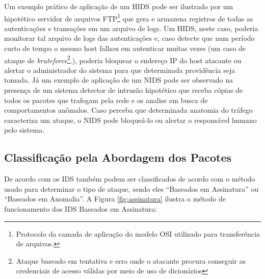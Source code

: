 Um exemplo prático de aplicação de um HIDS pode ser ilustrado por um hipotético servidor de arquivos FTP\footnote{Protocolo da camada de aplicação do modelo OSI utilizado para transferência de arquivos.} que gera e armazena registros de todas as autenticações e transações em um arquivo de logs. Um HIDS, neste caso, poderia monitorar tal arquivo de logs das autenticações e, caso detecte que num período curto de tempo o mesmo host falhou em autenticar muitas vezes (um caso de ataque de \textit{bruteforce}\footnote{Ataque baseado em tentativa e erro onde o atacante procura conseguir as credenciais de acesso válidas por meio de uso de dicionários}.), poderia bloquear o endereço IP do host atacante ou alertar o administrador do sistema para que determinada providência seja tomada. Já um exemplo de aplicação de um NIDS pode ser observado na presença de um sistema detector de intrusão hipotético que receba cópias de todos os pacotes que trafegam pela rede e os analise em busca de comportamentos anômalos. Caso perceba que determinada anatomia do tráfego caracteriza um ataque, o NIDS pode bloqueá-lo ou alertar o responsável humano pelo sistema.















\subsection{Classificação pela Abordagem dos Pacotes}
\label{subsec:abordagem}


De acordo com  os IDS também podem ser classificados de acordo com o método usado para determinar o tipo de ataque, sendo eles ``Baseados em Assinatura'' ou ``Baseados em Anomalia''. A Figura \ref{fig:assinatura} ilustra o método de funcionamento dos IDS Baseados em Assinatura: 

